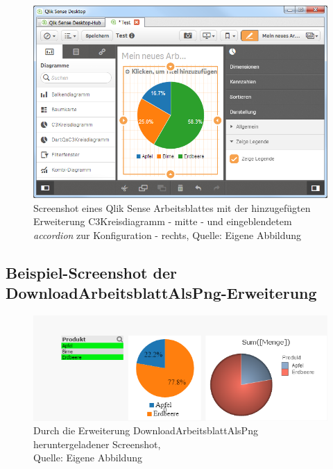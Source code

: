 \begin{appendix}
\begin{figure}[htbp]
	\centering
		\includegraphics[width=1.00\textwidth]{img/SenseScreenshots/ArbeitsblattQlikSense.PNG}
	\caption[Screenshot des C3Kreisdiagramms in einem Qlik Sense Arbeitsblatt]{Screenshot eines Qlik Sense Arbeitsblattes mit der hinzugefügten Erweiterung C3Kreisdiagramm - mitte - und eingeblendetem \textit{accordion} zur Konfiguration - rechts, Quelle: Eigene Abbildung}
	\label{fig:ArbeitsblattQlikSense}
\end{figure}


\newpage
\subsection{Beispiel-Screenshot der DownloadArbeitsblattAlsPng-Erweiterung} 
\label{lab:BeispielScreenshotDownloadArbeitsblattAlsPng} 



\begin{figure}[htbp]
	\centering
		\includegraphics[width=1.00\textwidth]{img/ScreenshotSheet/ScreenshotSheet.png}
	\caption[Durch die Erweiterung DownloadArbeitsblattAlsPng heruntergeladener Screenshot]{Durch die Erweiterung DownloadArbeitsblattAlsPng heruntergeladener Screenshot, \\Quelle: Eigene Abbildung}
	\label{fig:ScreenshotSheet}
\end{figure}



\end{appendix}
